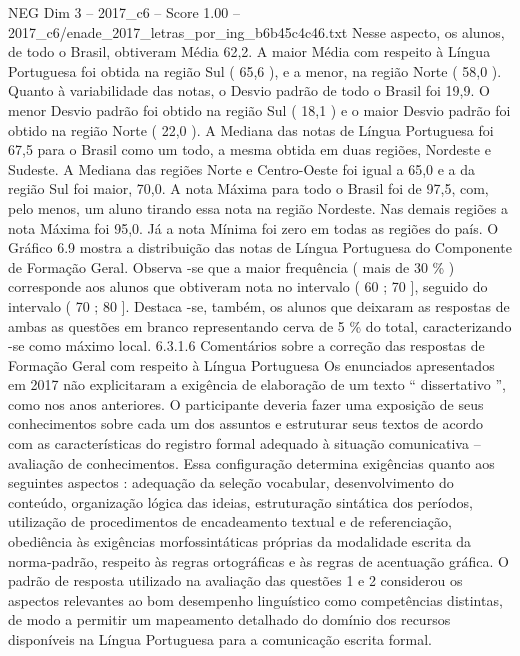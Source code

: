 \begin{textsample}{NEG Dim 3 – 2017\_c6 – Score 1.00 – 2017\_c6/enade\_2017\_letras\_por\_ing\_b6b45c4c46.txt}
Nesse aspecto, os alunos, de todo o Brasil, obtiveram Média 62,2.
A maior Média com respeito à Língua Portuguesa foi obtida na região Sul ( 65,6 ), e a menor, na região Norte ( 58,0 ).
Quanto à variabilidade das notas, o Desvio padrão de todo o Brasil foi 19,9.
O menor Desvio padrão foi obtido na região Sul ( 18,1 ) e o maior Desvio padrão foi obtido na região Norte ( 22,0 ).
A Mediana das notas de Língua Portuguesa foi 67,5 para o Brasil como um todo, a mesma obtida em duas regiões, Nordeste e Sudeste.
A Mediana das regiões Norte e Centro-Oeste foi igual a 65,0 e a da região Sul foi maior, 70,0.
A nota Máxima para todo o Brasil foi de 97,5, com, pelo menos, um aluno tirando essa nota na região Nordeste.
Nas demais regiões a nota Máxima foi 95,0.
Já a nota Mínima foi zero em todas as regiões do país.
O Gráfico 6.9 mostra a distribuição das notas de Língua Portuguesa do Componente de Formação Geral.
Observa -se que a maior frequência ( mais de 30 \% ) corresponde aos alunos que obtiveram nota no intervalo ( 60 ; 70 ], seguido do intervalo ( 70 ; 80 ].
Destaca -se, também, os alunos que deixaram as respostas de ambas as questões em branco representando cerva de 5 \% do total, caracterizando -se como máximo local. 6.3.1.6 Comentários sobre a correção das respostas de Formação Geral com respeito à Língua Portuguesa Os enunciados apresentados em 2017 não explicitaram a exigência de elaboração de um texto “ dissertativo ”, como nos anos anteriores.
O participante deveria fazer uma exposição de seus conhecimentos sobre cada um dos assuntos e estruturar seus textos de acordo com as características do registro formal adequado à situação comunicativa – avaliação de conhecimentos.
Essa configuração determina exigências quanto aos seguintes aspectos : adequação da seleção vocabular, desenvolvimento do conteúdo, organização lógica das ideias, estruturação sintática dos períodos, utilização de procedimentos de encadeamento textual e de referenciação, obediência às exigências morfossintáticas próprias da modalidade escrita da norma-padrão, respeito às regras ortográficas e às regras de acentuação gráfica.
O padrão de resposta utilizado na avaliação das questões 1 e 2 considerou os aspectos relevantes ao bom desempenho linguístico como competências distintas, de modo a permitir um mapeamento detalhado do domínio dos recursos disponíveis na Língua Portuguesa para a comunicação escrita formal.

\end{textsample}
